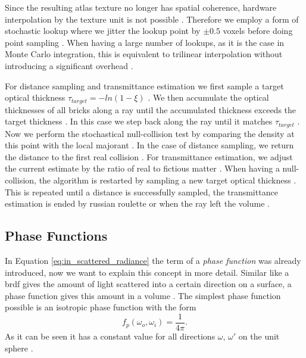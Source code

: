 Since the resulting atlas texture no longer has spatial coherence, hardware interpolation by the texture unit is not possible \cite{brick_grid}.
Therefore we employ a form of stochastic lookup where we jitter the lookup point by $\pm0.5$ voxels before doing point sampling \cite{brick_grid}.
When having a large number of lookups, as it is the case in Monte Carlo integration, this is equivalent to trilinear interpolation without introducing a significant overhead \cite{brick_grid}.

For distance sampling and transmittance estimation we first sample a target optical thickness $\tau_{target}=-ln(1-\xi)$ \cite{brick_grid}.
We then accumulate the optical thicknesses of all bricks along a ray until the accumulated thickness exceeds the target thickness \cite{brick_grid}.
In this case we step back along the ray until it matches $\tau_{target}$ \cite{brick_grid}.
Now we perform the stochastical null-collision test by comparing the density at this point with the local majorant \cite{brick_grid}.
In the case of distance sampling, we return the distance to the first real collision \cite{brick_grid}.
For transmittance estimation, we adjust the current estimate by the ratio of real to fictious matter \cite{brick_grid}.
When having a null-collision, the algorithm is restarted by sampling a new target optical thickness \cite{brick_grid}.
This is repeated until a distance is successfully sampled, the transmittance estimation is ended by russian roulette or when the ray left the volume \cite{brick_grid}.

\subsection{Phase Functions}
\label{subsec:phase_function}
In Equation \ref{eq:in_scattered_radiance} the term of a \textit{phase function} was already introduced, now we want to explain this concept in more detail.
Similar like a \acs{brdf} gives the amount of light scattered into a certain direction on a surface, a phase function gives this amount in a volume \cite{novak_overview}.
The simplest phase function possible is an isotropic phase function with the form
\begin{equation}
    f_p(\omega_o, \omega_i)=\frac{1}{4\pi}.
\end{equation}
As it can be seen it has a constant value for all directions $\omega$, $\omega'$ on the unit sphere \cite{novak_overview}.

